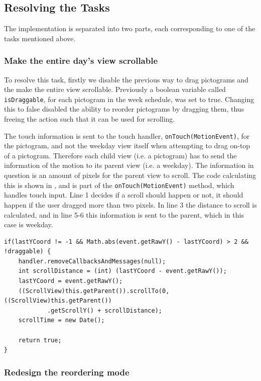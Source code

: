 \subsection*{Resolving the Tasks}
The implementation is separated into two parts, each corresponding to one of the tasks mentioned above. 
\subsubsection*{Make the entire day's view scrollable}
To resolve this task, firstly we disable the previous way to drag pictograms and the make the entire view scrollable. 
Previously a boolean variable called \texttt{isDraggable}, for each pictogram in the week schedule, was set to true. 
Changing this to false disabled the ability to reorder pictograms by dragging them, thus freeing the action such that it can be used for scrolling.

The touch information is sent to the touch handler, \texttt{onTouch(MotionEvent)}, for the pictogram, and not the weekday view itself when attempting to drag on-top of a pictogram. 
Therefore each child view (i.e. a pictogram) has to send the information of the motion to its parent view (i.e. a weekday). 
The information in question is an amount of pixels for the parent view to scroll. 
The code calculating this is shown in , and is part of the \texttt{onTouch(MotionEvent)} method, which handles touch input. 
Line 1 decides if a scroll should happen or not, it should happen if the user dragged more than two pixels. 
In line 3 the distance to scroll is calculated, and in line 5-6 this information is sent to the parent, which in this case is weekday.

\begin{lstlisting}[floatplacement=h, caption={The code executed when someone performs a move action.}, label={lst:actionmove}] 
if(lastYCoord != -1 && Math.abs(event.getRawY() - lastYCoord) > 2 && !draggable) {
    handler.removeCallbacksAndMessages(null);
    int scrollDistance = (int) (lastYCoord - event.getRawY());
    lastYCoord = event.getRawY();
    ((ScrollView)this.getParent()).scrollTo(0,((ScrollView)this.getParent())
            .getScrollY() + scrollDistance);
    scrollTime = new Date();

    return true;
}
\end{lstlisting}

\subsubsection*{Redesign the reordering mode}

